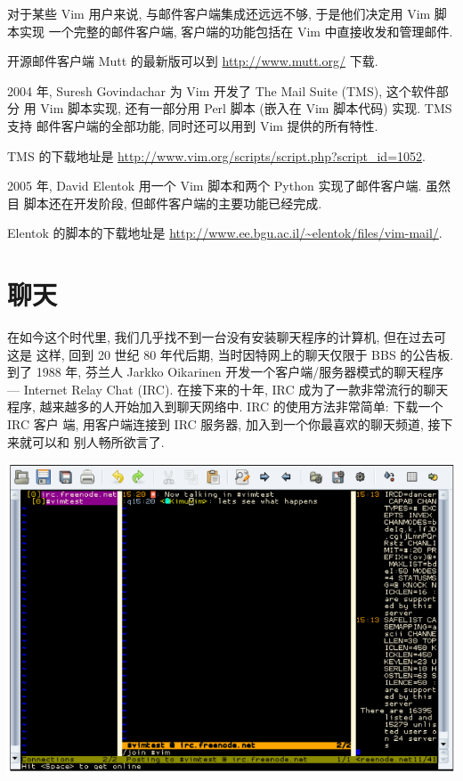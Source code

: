 对于某些 Vim 用户来说, 与邮件客户端集成还远远不够, 于是他们决定用 Vim 脚本实现
一个完整的邮件客户端, 客户端的功能包括在 Vim 中直接收发和管理邮件.

\begin{warning}
    开源邮件客户端 Mutt 的最新版可以到 \url{http://www.mutt.org/} 下载.
\end{warning}

2004 年, Suresh Govindachar 为 Vim 开发了 The Mail Suite (TMS), 这个软件部分
用 Vim 脚本实现, 还有一部分用 Perl 脚本 (嵌入在 Vim 脚本代码) 实现. TMS 支持
邮件客户端的全部功能, 同时还可以用到 Vim 提供的所有特性.

TMS 的下载地址是 \url{http://www.vim.org/scripts/script.php?script_id=1052}.

2005 年, David Elentok 用一个 Vim 脚本和两个 Python 实现了邮件客户端. 虽然目
脚本还在开发阶段, 但邮件客户端的主要功能已经完成.

Elentok 的脚本的下载地址是
\url{http://www.ee.bgu.ac.il/~elentok/files/vim-mail/}.

\section{聊天}
\label{sec:chat_with_vim}

在如今这个时代里, 我们几乎找不到一台没有安装聊天程序的计算机, 但在过去可这是
这样, 回到 20 世纪 80 年代后期, 当时因特网上的聊天仅限于 BBS 的公告板. 到了
1988 年, 芬兰人 Jarkko Oikarinen 开发一个客户端/服务器模式的聊天程序 ---
Internet Relay Chat (IRC). 在接下来的十年, IRC 成为了一款非常流行的聊天程序,
越来越多的人开始加入到聊天网络中. IRC 的使用方法非常简单: 下载一个 IRC 客户
端, 用客户端连接到 IRC 服务器, 加入到一个你最喜欢的聊天频道, 接下来就可以和
别人畅所欲言了.

\begin{center}
	\includegraphics[scale=0.6]{./images/page211.png}
\end{center}

